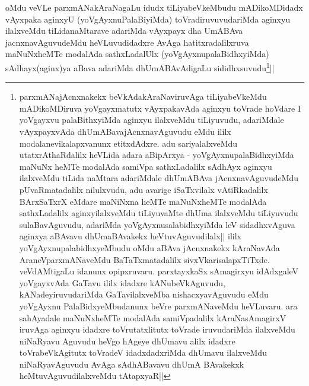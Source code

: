 \begin{artha}
oMdu veVLe parxmANakAraNagaLu idudx tiLiyabeVkeMbudu mADikoMDidadx vAyxpaka aginxyU (yoVgAyxnuPalaBiyiMda) toVradiruvuvudariMda aginxyu ilalxveMdu tiLidanaMtarave adariMda vAyxpayx dha UmABAva jacnxnavAguvudeMdu heVLuvudidadxre AvAga hatitxradalilxruva maNuNxheMTe modalAda sathxLadalUlx (yoVgAyxnupalaBidhxyiMda) sAdhayx(aginx)ya aBava adariMda dhUmABAvAdigaLu sididhxsuvudu\footnote{parxmANajAcnxnakekx beVkAdakAraNaviruvAga tiLiyabeVkeMdu mADikoMDiruva yoVgayxmatutx vAyxpakavAda aginxyu toVrade hoVdare I yoVgayxvu palaBithxyiMda aginxyu ilalxveMdu tiLiyuvudu, adariMdale vAyxpayxvAda dhUmABavajAcnxnavAguvudu eMdu ililx modalanevikalapxvanunx etitxdAdxre. adu sariyalalxveMdu utatxrAthaRdalilx heVLida adara aBipArxya - yoVgAyxnupalaBidhxyiMda maNuNx heMTe modalAda samiVpa sathxLadalilx sAdhAyx aginxyu ilalxveMdu tiLida naMtara adariMdale dhUmABAva jAcnxnavAguvudeMdu pUvaRmatadalilx nilulxvudu, adu avarige iSaTxvilalx vAtiRkadalilx BArxSaTxrX eMdare maNiNxna heMTe maNuNxheMTe modalAda sathxLadalilx aginxyilalxveMdu tiLiyuvaMte dhUma ilalxveMdu tiLiyuvudu sulaBavAguvudu, adariMda yoVgAyxnusalabidhxyiMda leV sidadhxvAguva aginxya aBAvavu dhUmaBAvakekx heVtuvAguvudilalx||
ililx yoVgAyxnupalabidhxyeMbudu oMdu aBAva jAcnxnakekx kAraNavAda AraneVparxmANaveMdu BaTaTxmatadalilx sivxVkarisalapxTiTxde. veVdAMtigaLu idanunx opipxruvaru. parxtayxkaSx sAmagirxyu idAdxgaleV yoVgayxvAda GaTavu ililx idadxre kANubeVkAguvudu, kANadeyiruvudariMda GaTavilalxveMba nishacxyavAguvudu eMdu yoVgAyxnu PalaBidxyeMbudanunx beVre parxmANaveMdu heVLuvaru. ara sahAyadale maNuNxheMTe modalAda samiVpadalilx kAraNasAmagirxV iruvAga aginxyu idadxre toVrutatxlitutx toVrade iruvudariMda ilalxveMdu niNaRyavu Aguvudu heVgo hAgeye dhUmavu alilx idadxre toVrabeVkAgitutx  toVradeV idadxdadxriMda dhUmavu  ilalxveMdu niNaRyavAguvudu AvAga sAdhABavavu dhUmA BAvakekxk heMtuvAguvudilalxveMdu tAtapxyaR||
}||
\end{artha}

